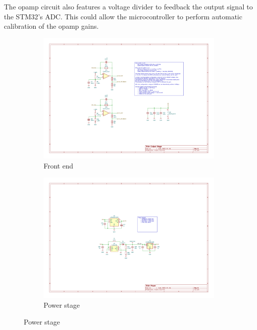 The opamp circuit also features a voltage divider to feedback the output signal to the STM32's ADC. This could allow the microcontroller to perform automatic calibration of the opamp gains.

\begin{figure}[h]
      \captionsetup[subfigure]{labelformat=empty}
      \centering
      \begin{subfigure}[b]{0.4\textwidth}
            \centering
            \includegraphics[width=\textwidth]{graphics/front_end.pdf}
            \caption{Front end}
      \end{subfigure}
      \hfill
      \begin{subfigure}[b]{0.59\textwidth}
            \centering
            \includegraphics[width=\textwidth]{graphics/power_stage.pdf}
            \caption{Power stage}
      \end{subfigure}
\end{figure}

